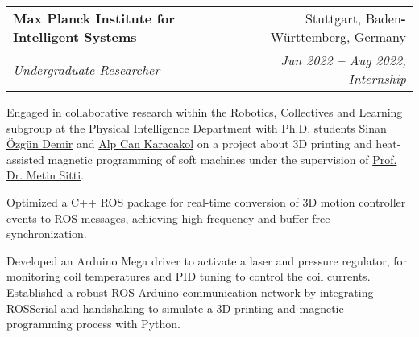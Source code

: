 \documentclass[letterpaper,11pt]{article}
\makeatletter
\newcommand{\resumeItem}[1]{\item\small{{#1 \vspace{-2pt}}}}
\newcommand{\resumeSubheading}[4]{\vspace{-2pt}\item
    \begin{tabular*}{0.97\textwidth}[t]{l@{\extracolsep{\fill}}r}
      \textbf{#1} & #2 \\
      \textit{\small#3} & \textit{\small #4} \\
    \end{tabular*}\vspace{-7pt}
}
\makeatother
\begin{document}
    \resumeSubheading
      {Max Planck Institute for Intelligent Systems}{Stuttgart, Baden\textbf{-}Württemberg, Germany}
      {Undergraduate Researcher}{Jun 2022 \textbf{--} Aug 2022, Internship}
        \resumeItemListStart
            \resumeItem{Engaged in collaborative research within the Robotics, Collectives and Learning subgroup at the Physical Intelligence Department with Ph.D. students \href{https://www.linkedin.com/in/sinan-ozgun-demir-981311129/}{\color{blue}Sinan Özgün Demir} and \href{https://www.linkedin.com/in/alpkaracakol/}{\color{blue}Alp Can Karacakol} on a project about 3D printing and heat-assisted magnetic programming of soft machines under the supervision of \href{https://www.linkedin.com/in/metin-sitti-0a8a712/}{\color{blue}Prof. Dr. Metin Sitti}.}
            \resumeItem{Optimized a C++ ROS package for real-time conversion of 3D motion controller events to ROS messages, achieving high-frequency and buffer-free synchronization.}
            \resumeItem{Developed an Arduino Mega driver to activate a laser and pressure regulator, for monitoring coil temperatures and PID tuning to control the coil currents. Established a robust ROS-Arduino communication network by integrating ROSSerial and handshaking to simulate a 3D printing and magnetic programming process with Python.}
        \resumeItemListEnd
    
\end{document}
